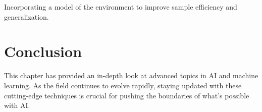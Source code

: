 Incorporating a model of the environment to improve sample efficiency
and generalization.

\section{Conclusion}

This chapter has provided an in-depth look at advanced topics in AI and
machine learning. As the field continues to evolve rapidly, staying
updated with these cutting-edge techniques is crucial for pushing the
boundaries of what's possible with AI.



